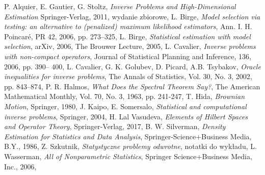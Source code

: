 \documentclass{article}
\begin{document}
\begin{thebibliography}{100}
 P. Alquier,	E. Gautier, G. Stoltz, \emph{Inverse Problems and High-Dimensional Estimation}	Springer-Verlag, 2011, wydanie zbiorowe,
 L. Birge, \emph{Model selection via testing: an alternative to (penalized) maximum likelihood estimators}, Ann. I. H. Poincaré, PR 42, 2006, pp. 273–325,
 L. Birge, \emph{Statistical estimation with model selection}, arXiv, 2006, The Brouwer Lecture, 2005,
  L. Cavalier, \emph{Inverse problems with non-compact operators}, Journal of Statistical Planning and
Inference, 136, 2006, pp. 390-- 400,
 L. Cavalier, G. K. Golubev, D. Picard, A.B. Tsybakov, \emph{Oracle inequalities for inverse problems}, The Annals of Statistics, Vol. 30, No. 3, 2002, pp. 843–874,	
  P. R. Halmos, \emph{What Does the Spectral Theorem Say?}, The American Mathematical Monthly, Vol. 70, No. 3, 1963, pp. 241-247,
 T. Hida, \emph{Brownian Motion}, Springer, 1980,
J. Kaipo, E. Somersalo, \emph{Statistical and computational inverse problems}, Springer, 2004,
H. Lal Vasudeva, \emph{Elements of Hilbert Spaces and Operator Theory}, Springer-Verlag, 2017,
 B. W. Silverman, \emph{Density Estimation for Statistics and Data Analysis}, Springer-Science+Business Media, B.Y., 1986,
Z. Szkutnik, \emph{Statystyczne problemy odwrotne}, notatki do wykładu,
L. Wasserman, \emph{All of Nonparametric Statistics},	Springer Science+Business Media, Inc.,	2006,

\end{thebibliography}
\end{document}
